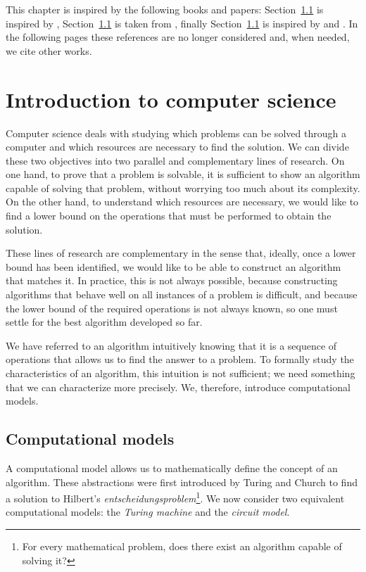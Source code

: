 This chapter is inspired by the following books and papers: Section~\ref{} is inspired by \cite[chapter $3$ and$4$]{nielsen2010quantum}, Section~\ref{} is taken from \cite[chapter $2$, $3$,$4$ and $7$]{nielsen2010quantum}, finally Section~\ref{} is inspired by \cite[chaper $2$ and $3$]{mcgeoch2022adiabatic} and \cite{k2005transverse}. In the following pages these references are no longer considered and, when needed, we cite other works.

\section{Introduction to computer science}
Computer science deals with studying which problems can be solved through a computer and which resources are necessary to find the solution. We can divide these two objectives into two parallel and complementary lines of research. On one hand, to prove that a problem is solvable, it is sufficient to show an algorithm capable of solving that problem, without worrying too much about its complexity. On the other hand, to understand which resources are necessary, we would like to find a lower bound on the operations that must be performed to obtain the solution.

These lines of research are complementary in the sense that, ideally, once a lower bound has been identified, we would like to be able to construct an algorithm that matches it. In practice, this is not always possible, because constructing algorithms that behave well on all instances of a problem is difficult, and because the lower bound of the required operations is not always known, so one must settle for the best algorithm developed so far.

We have referred to an algorithm intuitively knowing that it is a sequence of operations that allows us to find the answer to a problem. To formally study the characteristics of an algorithm, this intuition is not sufficient; we need something that we can characterize more precisely. We, therefore, introduce computational models.
\subsection{Computational models}
A computational model allows us to mathematically define the concept of an algorithm. These abstractions were first introduced by Turing and Church to find a solution to Hilbert's \emph{entscheidungsproblem}\footnote{For every mathematical problem, does there exist an algorithm capable of solving it?}. We now consider two equivalent computational models: the \emph{Turing machine} and the \emph{circuit model}. 
